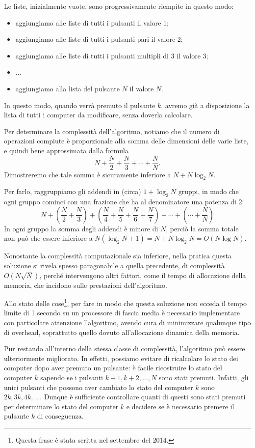 Le liste, inizialmente vuote, sono progressivamente riempite in questo modo:
\begin{itemize}[nolistsep, itemsep=2mm]
	\item aggiungiamo alle liste di tutti i pulsanti il valore 1;
	\item aggiungiamo alle liste di tutti i pulsanti pari il valore 2;
	\item aggiungiamo alle liste di tutti i pulsanti multipli di 3 il valore 3;
	\item ...
	\item aggiungiamo alla lista del pulsante $N$ il valore $N$.
\end{itemize}

In questo modo, quando verrà premuto il pulsante $k$, avremo già a disposizione la lista di tutti i computer da modificare, senza doverla calcolare.

Per determinare la complessità dell'algoritmo, notiamo che il numero di operazioni compiute è proporzionale alla somma delle dimensioni delle varie liste, e quindi bene approssimata dalla formula $$N+\frac{N}{2}+\frac{N}{3} + \cdots+\frac{N}{N}.$$
Dimostreremo che tale somma è sicuramente inferiore a $N + N \log_2 N$.

Per farlo, raggruppiamo gli addendi in (circa) $1 + \log_2 N$ gruppi, in modo che ogni gruppo cominci con una frazione che ha al denominatore una potenza di 2:
$$N + \left(\frac{N}{2} + \frac{N}{3}\right) + \left(\frac{N}{4} + \frac{N}{5} + \frac{N}{6} + \frac{N}{7}\right) + \cdots + \left(\cdots + \frac{N}{N}\right)$$
In ogni gruppo la somma degli addendi è minore di $N$, perciò la somma totale non può che essere inferiore a $N (\log_2 N + 1) = N + N \log_2 N = O(N \log N)$.

Nonostante la complessità computazionale sia inferiore, nella pratica questa soluzione si rivela spesso paragonabile a quella precedente, di complessità $O(N\sqrt{N})$, perché intervengono altri fattori, come il tempo di allocazione della memoria, che incidono sulle prestazioni dell'algoritmo.

Allo stato delle cose\footnote{Questa frase è stata scritta nel settembre del 2014.}, per fare in modo che questa soluzione non ecceda il tempo limite di 1 secondo su un processore di fascia media è necessario implementare con particolare attenzione l'algoritmo, avendo cura di minimizzare qualunque tipo di overhead, soprattutto quello dovuto all'allocazione dinamica della memoria.

\NlogNVeloce
Pur restando all'interno della stessa classe di complessità, l'algoritmo può essere ulteriormente migliorato. In effetti, possiamo evitare di ricalcolare lo stato dei computer dopo aver premuto un pulsante: è facile ricostruire lo stato del computer $k$ sapendo se i pulsanti $k+1, k+2, \ldots, N$ sono stati premuti. Infatti, gli unici pulsanti che possono aver cambiato lo stato del computer $k$ sono $2k, 3k, 4k, \ldots$. Dunque è sufficiente controllare quanti di questi sono stati premuti per determinare lo stato del computer $k$ e decidere se è necessario premere il pulsante $k$ di conseguenza.

